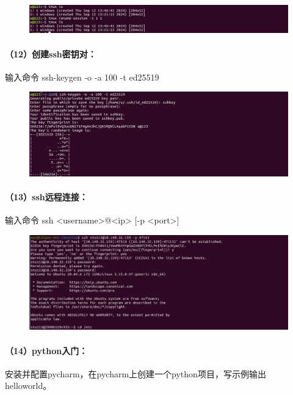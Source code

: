 \documentclass[a4paper, 12pt]{article}
\begin{document}
	\begin{figure}[H]
		\centering
		\includegraphics[width=1\textwidth]{026.jpg}
	\end{figure}
	
	\paragraph{（12）创建ssh密钥对：}
	输入命令 ssh-keygen -o -a 100 -t ed25519
	
	\begin{figure}[H]
		\centering
		\includegraphics[width=1\textwidth]{027.jpg}
	\end{figure}
	
	\paragraph{（13）ssh远程连接：}	
	输入命令 ssh <username>@<ip> [-p <port>]
	
	\begin{figure}[H]
		\centering
		\includegraphics[width=1\textwidth]{028.jpg}
	\end{figure}
	
	\paragraph{（14）python入门：}安装并配置pycharm，在pycharm上创建一个python项目，写示例输出helloworld。
	
\end{document}
